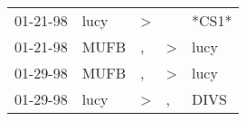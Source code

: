 \begin{supertabular}{lllll}
 01-21-98 &  lucy &  \textgreater &               &  *CS1* \\
 01-21-98 &  MUFB &             , &  \textgreater &   lucy \\
 01-29-98 &  MUFB &             , &  \textgreater &   lucy \\
 01-29-98 &  lucy &  \textgreater &             , &   DIVS \\
\end{supertabular}
